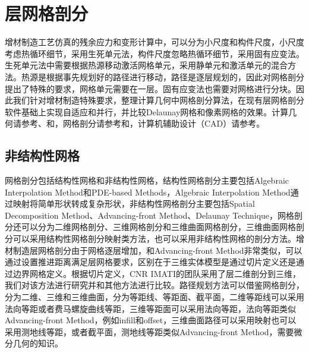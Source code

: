 \chapter{层网格剖分}

增材制造工艺仿真的残余应力和变形计算中，可以分为小尺度和构件尺度，小尺度考虑热循环细节，采用生死单元法，构件尺度忽略热循环细节，采用固有应变法。生死单元法中需要根据热源移动激活网格单元，采用静单元和激活单元的混合方法。热源是根据事先规划好的路径进行移动，路径是逐层规划的，因此对网格剖分提出了特殊的要求，网格单元需要在一层。固有应变法也需要对网格进行分块。因此我们针对增材制造特殊要求，整理计算几何中网格剖分算法，在现有层网格剖分软件基础上实现自适应和并行，并比较Delaunay网格和像素网格的效果。计算几何请参考\cite{JeanMarietteHerve}、\cite{JakobJensFrançoisHenrik}和\cite{MarkMarcMarkOtfried}，网格剖分请参考\cite{PascalPaul}和\cite{PaulHouman}，计算机辅助设计（CAD）请参考\cite{Erich}。

\section{非结构性网格}

网格剖分包括结构性网格和非结构性网格，结构性网格剖分主要包括Algebraic Interpolation Method和PDE-based Methods，Algebraic Interpolation Method通过映射将简单形状转成复杂形状，非结构性网格剖分主要包括Spatial Decomposition Method、Advancing-front Method、Delaunay Technique，网格剖分还可以分为二维网格剖分、三维网格剖分和三维曲面网格剖分，三维曲面网格剖分可以采用结构性网格剖分映射类方法，也可以采用非结构性网格的剖分方法。增材制造层网格剖分由于网格逐层增加，和Advancing-front Method非常类似，可以通过设置推进距离满足层网格要求，区别在于三维实体模型是通过切片定义还是通过边界网格定义。根据切片定义，CNR IMATI的团队采用了层二维剖分到三维，我们对该方法进行研究并和其他方法进行比较。路径规划方法可以借鉴网格剖分，分为二维、三维和三维曲面，分为等距线、等距面、截平面，二维等距线可以采用法向等距或者费马螺旋曲线等距，三维等距面可以采用法向等距，法向等距类似Advancing-front Method，例如infill和offset，三维曲面路径可以采用映射也可以采用测地线等距，或者截平面，测地线等距类似Advancing-front Method，需要微分几何的知识。

